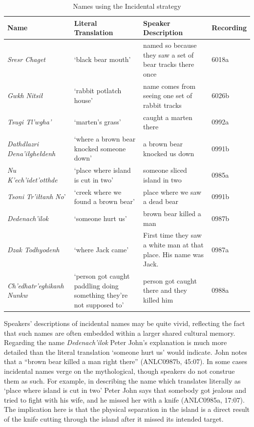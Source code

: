 \begin{table}[htb]
\caption{Names using the Incidental strategy}
\label{holton:tab:incidental}
\small
\begin{tabular}{l | L{3cm} | L{3cm} | l}
{\bfseries Name} &
{\bfseries Literal Translation} &
{\bfseries Speaker Description} &
{\bfseries Recording}\\\hline
\textit{Sresr Chaget} &
‘black bear mouth’ &
named so because they saw a set of bear tracks there once &
6018a\\
 \textit{Gwkh} \textit{Nitsił} &
‘rabbit potlatch house’ &
name comes from seeing one set of rabbit tracks &
6026b\\
\textit{Tsugi Tl’wgha’} &
‘marten’s grass’ &
caught a marten there &
0992a\\
 \textit{Dathdlazri Dena’iłghełdenh} &
‘where a brown bear knocked someone down’ &
a brown bear knocked us down &
0991b\\
\textit{Nu K’ech’idet’otthde} &
‘place where island is cut in two’ &
someone sliced island in two &
0985a\\
\textit{Tsoni} \textit{Tr’iłtanh} \textit{No}’ &
‘creek where we found a brown bear’ &
place where we saw a dead bear &
0991b\\
\textit{Dedenach’ilok} &
‘someone hurt us’ &
brown bear killed a man &
0987b\\
\textit{Dzak Todhyodenh} &
‘where Jack came’ &
First time they saw a white man at that place. His name was Jack. &
0987a\\
\textit{Ch’edhatr’eghikanh Nunkw} &
‘person got caught paddling doing something they’re not supposed to’ &
person got caught there and they killed him &
0988a \\
\end{tabular}
\end{table}

Speakers’ descriptions of incidental names may be quite vivid, reflecting the fact that such names are often embedded within a larger shared cultural memory. Regarding the name \textit{Dedenach’ilok} Peter John’s explanation is much more detailed than the literal translation ‘someone hurt us’ would indicate. John notes that a “brown bear killed a man right there” (ANLC0987b, 45:07). In some cases incidental names verge on the mythological, though speakers do not construe them as such. For example, in describing the name which translates literally as ‘place where island is cut in two’ Peter John says that {\textquotedbl}somebody got jealous and tried to fight with his wife, and he missed her with a knife{\textquotedbl} (ANLC0985a, 17:07). The implication here is that the physical separation in the island is a direct result of the knife cutting through the island after it missed its intended target.

